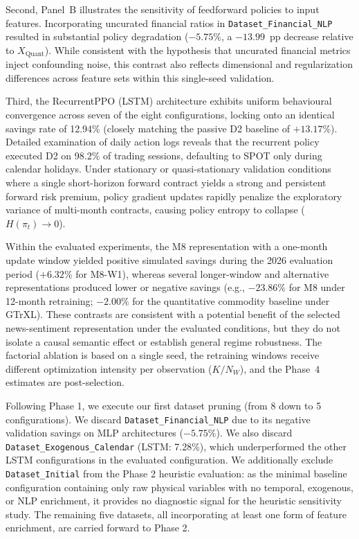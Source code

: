 Second, Panel~B illustrates the sensitivity of feedforward policies to input features. Incorporating uncurated financial ratios in \texttt{Dataset\_Financial\_NLP} resulted in substantial policy degradation ($-5.75\%$, a $-13.99$~pp decrease relative to $X_{\text{Quant}}$). While consistent with the hypothesis that uncurated financial metrics inject confounding noise, this contrast also reflects dimensional and regularization differences across feature sets within this single-seed validation.

Third, the RecurrentPPO (LSTM) architecture exhibits uniform behavioural convergence across seven of the eight configurations, locking onto an identical savings rate of 12.94\% (closely matching the passive D2 baseline of $+13.17\%$). Detailed examination of daily action logs reveals that the recurrent policy executed D2 on 98.2\% of trading sessions, defaulting to SPOT only during calendar holidays. Under stationary or quasi-stationary validation conditions where a single short-horizon forward contract yields a strong and persistent forward risk premium, policy gradient updates rapidly penalize the exploratory variance of multi-month contracts, causing policy entropy to collapse ($H(\pi_t) \to 0$).

Within the evaluated experiments, the M8 representation with a one-month update window yielded positive simulated savings during the 2026 evaluation period ($+6.32\%$ for M8-W1), whereas several longer-window and alternative representations produced lower or negative savings (e.g., $-23.86\%$ for M8 under 12-month retraining; $-2.00\%$ for the quantitative commodity baseline under GTrXL). These contrasts are consistent with a potential benefit of the selected news-sentiment representation under the evaluated conditions, but they do not isolate a causal semantic effect or establish general regime robustness. The factorial ablation is based on a single seed, the retraining windows receive different optimization intensity per observation ($K/N_W$), and the Phase~4 estimates are post-selection.

Following Phase 1, we execute our first dataset pruning (from 8 down to 5 configurations). We discard \texttt{Dataset\_Financial\_NLP} due to its negative validation savings on MLP architectures ($-5.75\%$). We also discard \texttt{Dataset\_Exogenous\_Calendar} (LSTM: 7.28\%), which underperformed the other LSTM configurations in the evaluated configuration. We additionally exclude \texttt{Dataset\_Initial} from the Phase 2 heuristic evaluation: as the minimal baseline configuration containing only raw physical variables with no temporal, exogenous, or NLP enrichment, it provides no diagnostic signal for the heuristic sensitivity study. The remaining five datasets, all incorporating at least one form of feature enrichment, are carried forward to Phase 2.
